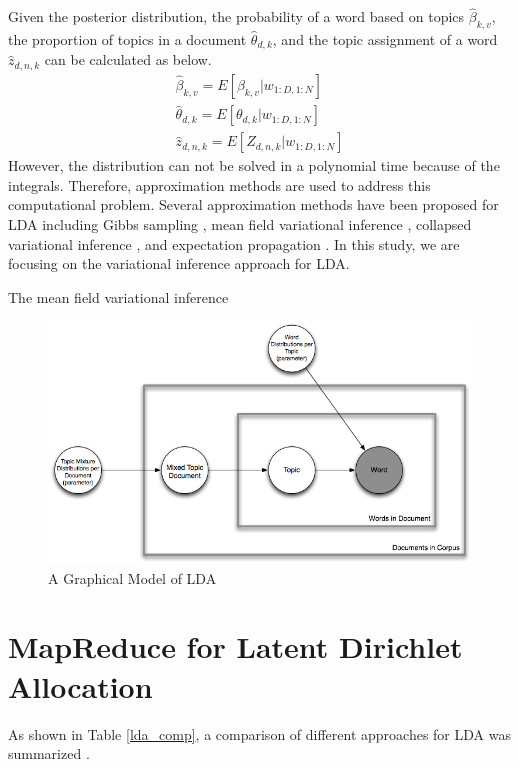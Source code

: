 \documentclass[conference]{IEEEtran}
\begin{document}
Given the posterior distribution, the probability of a word based on topics $\hat{\beta}_{k,v}$, the proportion of topics in a document $\hat{\theta}_{d,k}$, and the topic assignment of a word $\hat{z}_{d,n,k}$  can be calculated as below.
\begin{equation}
\begin{split}
\hat{\beta}_{k,v} = E[\beta_{k,v}|w_{1:D,1:N}]\\
\hat{\theta}_{d,k} = E[\theta_{d,k}|w_{1:D,1:N}]\\
\hat{z}_{d,n,k} = E[Z_{d,n,k}|w_{1:D,1:N}]
\end{split}
\end{equation}
However, the distribution can not be solved in a polynomial time because of the integrals. Therefore, approximation methods are used to address this computational problem. Several approximation methods have been proposed for LDA including Gibbs sampling \cite{steyvers2007probabilistic}, mean field variational inference \cite{blei2003latent}, collapsed variational inference \cite{teh2006collapsed}, and expectation propagation \cite{minka2002expectation}. In this study, we are focusing on the variational inference approach for LDA.


The mean field variational inference

\begin{figure}[!t]
\centering
\includegraphics[width=5in]{lda.png}
\caption{A Graphical Model of LDA}
\label{gm_lda}
\end{figure}

\section{MapReduce for Latent Dirichlet Allocation}

As shown in Table \ref{lda_comp}, a comparison of different approaches for LDA was summarized \cite{zhai2012mr}.
\end{document}
